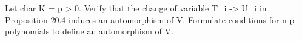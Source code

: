 Let char K = p > 0. Verify that the change of variable T_i -> U_i in Proposition 20.4 induces an automorphism of V. Formulate conditions for n p-polynomials to define an automorphism of V.
